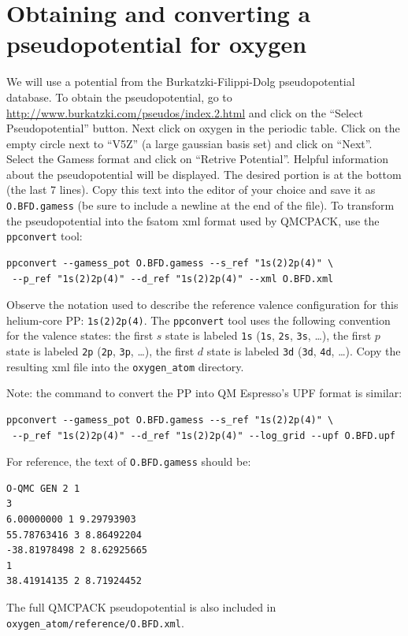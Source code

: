 \section{Obtaining and converting a pseudopotential for oxygen}\label{sec:lqb_pseudo}
We will use a potential from the Burkatzki-Filippi-Dolg pseudopotential database.  To obtain the pseudopotential, go to 
\href{http://www.burkatzki.com/pseudos/index.2.html}{http://www.burkatzki.com/pseudos/index.2.html}
and click on the ``Select Pseudopotential'' button.  Next click on oxygen in the 
periodic table.  Click on the empty circle next to ``V5Z'' (a large gaussian 
basis set) and click on ``Next''.  Select the Gamess format and click on 
``Retrive Potential''.  Helpful information about the pseudopotential will be 
displayed.  The desired portion is at the bottom (the last 7 lines).  Copy 
this text into the editor of your choice and save it as \texttt{O.BFD.gamess} 
(be sure to include a newline at the end of the file).  To transform the 
pseudopotential into the fsatom xml format used by QMCPACK, use the \texttt{ppconvert} 
tool:
\begin{shaded}
\begin{verbatim}
ppconvert --gamess_pot O.BFD.gamess --s_ref "1s(2)2p(4)" \
 --p_ref "1s(2)2p(4)" --d_ref "1s(2)2p(4)" --xml O.BFD.xml
\end{verbatim}
\end{shaded}
\noindent
Observe the notation used to describe the reference valence configuration for this helium-core PP: \texttt{1s(2)2p(4)}.  The \texttt{ppconvert} tool uses the following convention for the valence states: the first $s$ state is labeled \texttt{1s} (\texttt{1s}, \texttt{2s}, \texttt{3s}, \ldots), the first $p$ state is labeled \texttt{2p} (\texttt{2p}, \texttt{3p}, \ldots), the first $d$ state is labeled \texttt{3d} (\texttt{3d}, \texttt{4d}, \ldots). Copy the resulting xml file into the \texttt{oxygen\_atom} directory.

Note: the command to convert the PP into QM Espresso's UPF format is similar:
\begin{shaded}
\begin{verbatim}
ppconvert --gamess_pot O.BFD.gamess --s_ref "1s(2)2p(4)" \
 --p_ref "1s(2)2p(4)" --d_ref "1s(2)2p(4)" --log_grid --upf O.BFD.upf
\end{verbatim}
\end{shaded}

For reference, the text of \texttt{O.BFD.gamess} should be:
\begin{shaded}
\begin{verbatim}
O-QMC GEN 2 1
3
6.00000000 1 9.29793903
55.78763416 3 8.86492204
-38.81978498 2 8.62925665
1
38.41914135 2 8.71924452

\end{verbatim}
\end{shaded}
\noindent
The full QMCPACK pseudopotential is also included in \texttt{oxygen\_atom/reference/O.BFD.xml}.


